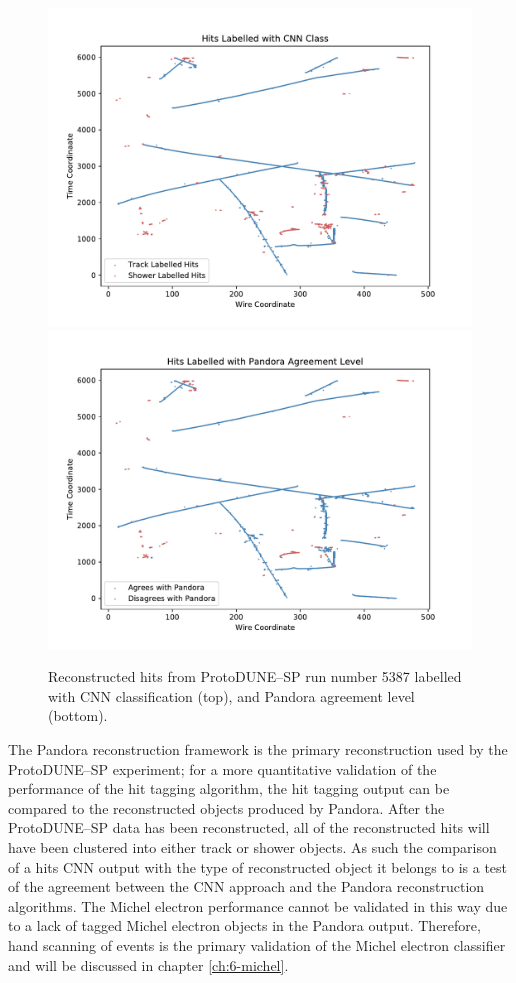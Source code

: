 \begin{figure}[h]
	\centering
	\includegraphics[height=0.45\textheight]{figures/track_score.pdf}
	\includegraphics[height=0.45\textheight]{figures/pandora_agreement.pdf} 
	\caption[CNN output on an event from ProtoDUNE--SP data.]{Reconstructed
	hits from ProtoDUNE--SP run number 5387 labelled with CNN classification
	(top), and Pandora agreement level (bottom).}
	\label{fig:real_event}
\end{figure}

The Pandora reconstruction framework is the primary reconstruction used by the
ProtoDUNE--SP experiment; for a more quantitative validation of the performance
of the hit tagging algorithm, the hit tagging output can be compared to the
reconstructed objects produced by Pandora. After the ProtoDUNE--SP data has been
reconstructed, all of the reconstructed hits will have been clustered into
either track or shower objects. As such the comparison of a hits CNN output with
the type of reconstructed object it belongs to is a test of the agreement
between the CNN approach and the Pandora reconstruction algorithms. The Michel
electron performance cannot be validated in this way due to a lack of tagged
Michel electron objects in the Pandora output. Therefore, hand scanning of
events is the primary validation of the Michel electron classifier and will be
discussed in chapter \ref{ch:6-michel}.


